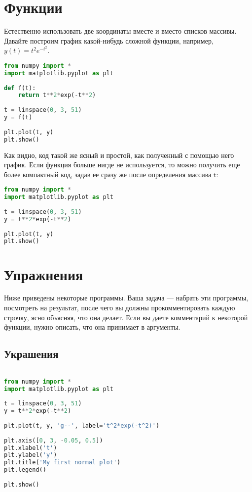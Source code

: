 \documentclass[a4paper,12pt]{article}
\begin{document}
\section{Функции}
Естественно использовать две координаты вместе и вместо списков массивы. Давайте построим график какой-нибудь сложной функции, например, $y(t) = t^2 e^{-t^2}$.

\begin{lstlisting}[language=python]
from numpy import *
import matplotlib.pyplot as plt
 
def f(t):
    return t**2*exp(-t**2)
 
t = linspace(0, 3, 51) 
y = f(t)
 
plt.plot(t, y)
plt.show()
\end{lstlisting}

Как видно, код такой же ясный и простой, как полученный с помощью него график. Если функция больше нигде не используется, то можно получить еще более компактный код, задав ее сразу же после определения массива t:

\begin{lstlisting}[language=python]
from numpy import *
import matplotlib.pyplot as plt
 
t = linspace(0, 3, 51)
y = t**2*exp(-t**2)
 
plt.plot(t, y)
plt.show()
\end{lstlisting}

\section{Упражнения}
Ниже приведены некоторые программы. Ваша задача --- набрать эти программы, посмотреть на результат, после чего вы должны прокомментировать каждую строчку, ясно объясняя, что она делает. Если вы даете комментарий к некоторой функции, нужно описать, что она принимает в аргументы.

\subsection{Украшения}
\begin{lstlisting}[language=python]

from numpy import *
import matplotlib.pyplot as plt
 
t = linspace(0, 3, 51)
y = t**2*exp(-t**2)
 
plt.plot(t, y, 'g--', label='t^2*exp(-t^2)')
 
plt.axis([0, 3, -0.05, 0.5]) 
plt.xlabel('t')    
plt.ylabel('y')  
plt.title('My first normal plot') 
plt.legend()       
 
plt.show()
 
\end{lstlisting}
\end{document}
